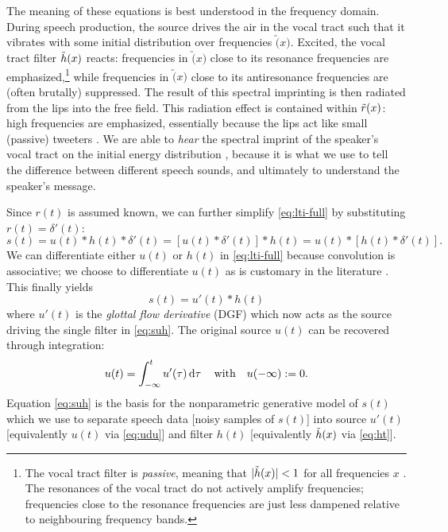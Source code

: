 \begin{chaptersections}
The meaning of these equations is best understood in the frequency domain.
During speech production, the source drives the air in the vocal tract such that it vibrates with some initial distribution over frequencies $\utilde(x)$.
Excited, the vocal tract filter $\tilde{h}(x)$ reacts: frequencies in $\utilde(x)$ close to its resonance frequencies are emphasized,\footnote{%
The vocal tract filter is \emph{passive}, meaning that $|\tilde{h}(x)| < 1$ for all frequencies $x$ \citep{Flanagan1965}.
The resonances of the vocal tract do not actively amplify frequencies;
frequencies close to the resonance frequencies are just less dampened relative to neighbouring frequency bands.
} while frequencies in $\utilde(x)$ close to its antiresonance frequencies are (often brutally) suppressed.
The result of this spectral imprinting is then radiated from the lips into the free field.
This radiation effect is contained within $\tilde{r}(x)$: high frequencies are emphasized, essentially because the lips act like small (passive) tweeters \citep{Schroeder1999}.
We are able to \emph{hear} the spectral imprint of the speaker's vocal tract on the initial energy distribution \citep{Klatt1986}, because it is what we use to tell the difference between different speech sounds, and ultimately to understand the speaker's message.

Since $r(t)$ is assumed known, we can further simplify \eqref{eq:lti-full} by substituting $r(t) = \delta'(t)$:
\begin{equation}
    s(t) = u(t) * h(t) * \delta'(t) = [u(t) * \delta'(t)] * h(t) = u(t) * [h(t) * \delta'(t)].
\end{equation}
We can differentiate either $u(t)$ or $h(t)$ in \eqref{eq:lti-full} because convolution is associative; we choose to differentiate $u(t)$ as is customary in the literature \citep{Doval2006}.
This finally yields
\begin{equation}
    \boxed{s(t) = u'(t) * h(t)} \label{eq:suh}
\end{equation}
where $u'(t)$ is the \emph{glottal flow derivative} (DGF) which now acts as the source driving the single filter in \eqref{eq:suh}.
The original source $u(t)$ can be recovered through integration:
\begin{equation}
    u(t) = \int_{-\infty}^t u'(\tau) \dd{\tau} \qq{with} u(-\infty) := 0. \label{eq:udu}
\end{equation}
Equation \eqref{eq:suh} is the basis for the nonparametric generative model of $s(t)$ which we use to separate speech data [noisy samples of $s(t)$] into source $u'(t)$ [equivalently $u(t)$ via \eqref{eq:udu}] and filter $h(t)$ [equivalently $\tilde{h}(x)$ via \eqref{eq:ht}].


\end{chaptersections}
